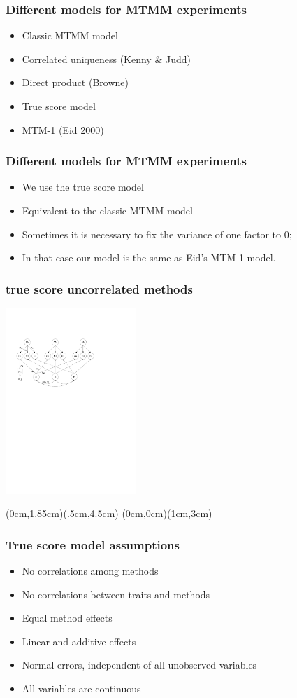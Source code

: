 \documentclass{beamer}
\begin{document}
\begin{frame}	
	\frametitle{Different models for MTMM experiments}
	\begin{itemize}[<alert@+>]
		\item Classic MTMM model
		\item Correlated uniqueness (Kenny \& Judd)
		\item Direct product (Browne)
		\item True score model
		\item MTM-1 (Eid 2000)
	\end{itemize}
\end{frame}	
\begin{frame}	
	\frametitle{Different models for MTMM experiments}
	\begin{itemize}[<alert@+>]
		\item We use the true score model
		\item Equivalent to the classic MTMM model
		\item Sometimes it is necessary to fix the variance of one factor to 0;
		\item In that case our model is the same as Eid's MTM-1 model.
	\end{itemize}
\end{frame}	
\begin{frame}	
	\frametitle{true score uncorrelated methods}
	\includegraphics[height=7cm]{i/MTMM.pdf}

	(0cm,1.85cm)(.5cm,4.5cm)
	(0cm,0cm)(1cm,3cm)
\end{frame}	

\begin{frame}	
	\frametitle{True score model assumptions}
	\begin{itemize}[<alert@+>]
		\item No correlations among methods
		\item No correlations between traits and methods
		\item Equal method effects
		\item Linear and additive effects
		\item Normal errors, independent of all unobserved variables
		\item All variables are continuous
	\end{itemize}
\end{frame}	
\end{document}
